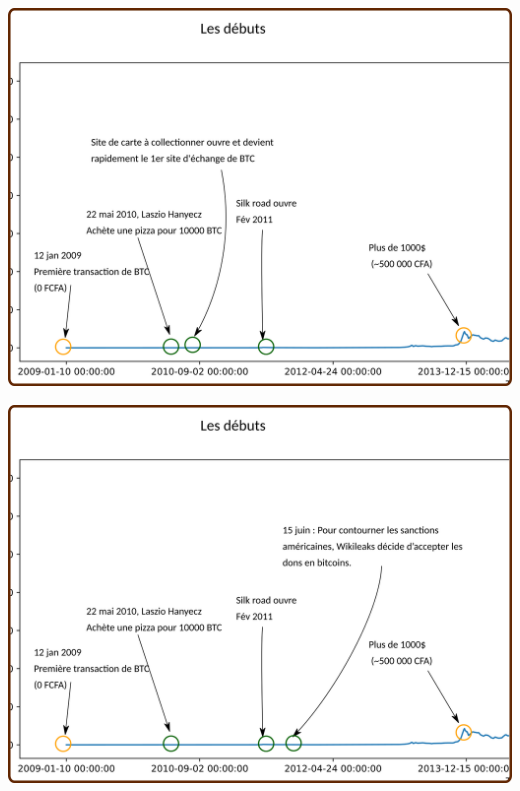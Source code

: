 \documentclass[presentation]{beamer}
\begin{document}
\begin{frame}[label={sec:orgb36eb10}]{}
\begin{center}
\includegraphics[width=.95\textwidth]{./Pictures/Timeline/06debut_silk.png}
\end{center}
\end{frame}

\begin{frame}[label={sec:org427466f}]{}
\begin{center}
\includegraphics[width=.95\textwidth]{./Pictures/Timeline/07debut_wiki.png}
\end{center}
\end{frame}
\end{document}
